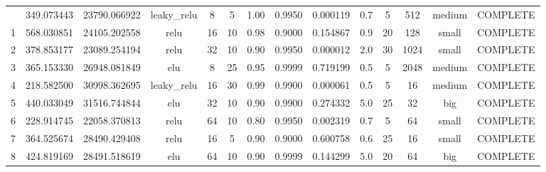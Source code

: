 \begin{longtable}{cccccccccccccc}
\bottomrule
\endlastfoot
                        0 &                 349.073443 &                       23790.066922 &     leaky\_relu &           8 &              5 &        1.00 & 0.9950 &       0.000119 &             0.7 &                  5 &      512 &    medium & COMPLETE \\
                        1 &                 568.030851 &                       24105.202558 &            relu &          16 &             10 &        0.98 & 0.9000 &       0.154867 &             0.9 &                 20 &      128 &     small & COMPLETE \\
                        2 &                 378.853177 &                       23089.254194 &            relu &          32 &             10 &        0.90 & 0.9950 &       0.000012 &             2.0 &                 30 &     1024 &     small & COMPLETE \\
                        3 &                 365.153330 &                       26948.081849 &             elu &           8 &             25 &        0.95 & 0.9999 &       0.719199 &             0.5 &                  5 &     2048 &    medium & COMPLETE \\
                        4 &                 218.582500 &                       30998.362695 &     leaky\_relu &          16 &             30 &        0.99 & 0.9900 &       0.000061 &             0.5 &                  5 &       16 &    medium & COMPLETE \\
                        5 &                 440.033049 &                       31516.744844 &             elu &          32 &             10 &        0.90 & 0.9900 &       0.274332 &             5.0 &                 25 &       32 &       big & COMPLETE \\
                        6 &                 228.914745 &                       22058.370813 &            relu &          64 &             10 &        0.80 & 0.9950 &       0.002319 &             0.7 &                  5 &       64 &     small & COMPLETE \\
                        7 &                 364.525674 &                       28490.429408 &            relu &          16 &              5 &        0.90 & 0.9000 &       0.600758 &             0.6 &                 25 &       16 &     small & COMPLETE \\
                        8 &                 424.819169 &                       28491.518619 &             elu &          64 &             10 &        0.90 & 0.9999 &       0.144299 &             5.0 &                 20 &       64 &       big & COMPLETE \\

\end{longtable}
